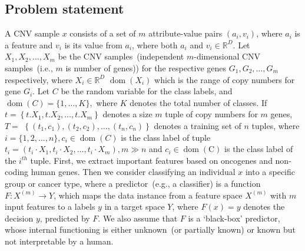 \subsection{Problem statement}
A CNV sample $x$ consists of a set of $m$ attribute-value pairs $\left(a_{i}, v_{i}\right)$, where $a_i$ is a feature and $v_i$ is its value from $a_{i}$, where both $a_{i}$ and $v_i \in \mathbb{R}^{D}$. %
Let $X_{1}, X_{2}, \ldots, X_{m}$ be the CNV samples~(independent $m$-dimensional CNV samples~(i.e., $m$ is number of genes)) for the respective genes $G_{1}, G_{2}, \ldots, G_{m}$ respectively, where $X_{i} \in \mathbb{R}^{D}$ $\operatorname{dom}\left(X_{i}\right)$ which is the range of copy numbers for gene $G_{i}$. Let $C$ be the random variable for the class labels, and $\operatorname{dom}(C)=\{1, \ldots, K\},$ where $K$ denotes the total number of classes. If $t=\left\{t . X_{1}, t . X_{2}, \ldots, t . X_{m}\right\}$ denotes a size $m$ tuple of copy numbers for $m$ genes, $T=$ $\left\{\left(t_{1}, c_{1}\right),\left(t_{2}, c_{2}\right), \ldots,\left(t_{n}, c_{n}\right)\right\}$ denotes a training set of $n$ tuples, where $i=\{1,2, \ldots, n\}, c_{i} \in \operatorname{dom}(C)$ is the class label of tuple $t_{i} 
=\left(t_{i} \cdot X_{1}, t_{i} \cdot X_{2}, \ldots, t_{i} \cdot X_{m}\right), m \gg n$ and $c_{i} \in \operatorname{dom}(\mathrm{C})$ is the class label of the $i^{th}$  tuple. 
First, we extract important features based on oncogenes and non-coding human genes. 
Then we consider classifying an individual $x$ into a specific group or cancer type, where a predictor~(e.g., a classifier) is a function $F: {X}^{(m)} \rightarrow {Y}$, which maps the data instance from a feature space ${X}^{(m)}$ with $m$ input features to a labels $y$ in a target space ${Y}$, where $F(x)=y$ denotes the decision $y$, predicted by $F$. We also assume that $F$ is a `black-box' predictor, whose internal functioning is either unknown~(or partially known) or known but not interpretable by a human. 
 
